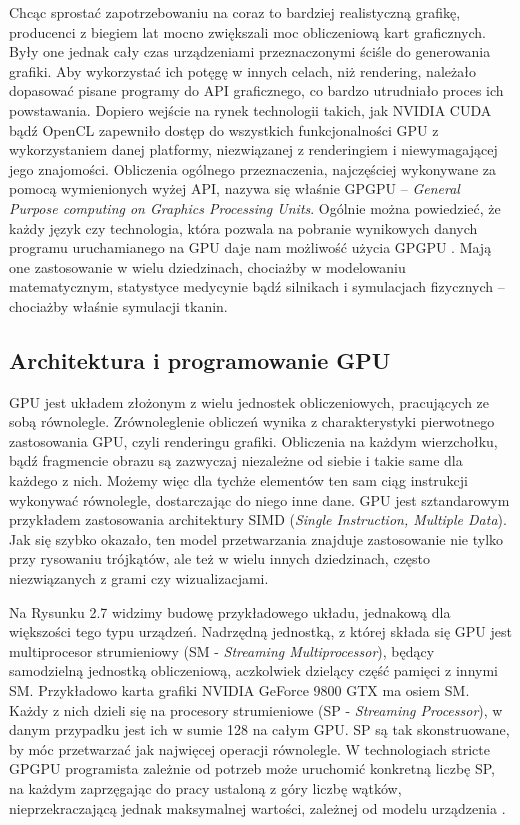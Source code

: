 		Chcąc sprostać zapotrzebowaniu na coraz to bardziej realistyczną grafikę, producenci z biegiem lat mocno zwiększali moc obliczeniową kart graficznych. Były one jednak cały czas urządzeniami przeznaczonymi ściśle do generowania grafiki. Aby wykorzystać ich potęgę w innych celach, niż rendering, należało dopasować pisane programy do API graficznego, co bardzo utrudniało proces ich powstawania. Dopiero wejście na rynek technologii takich, jak NVIDIA CUDA bądź OpenCL zapewniło dostęp do wszystkich funkcjonalności GPU z wykorzystaniem danej platformy, niezwiązanej z renderingiem i niewymagającej jego znajomości. Obliczenia ogólnego przeznaczenia, najczęściej wykonywane za pomocą wymienionych wyżej API, nazywa się właśnie GPGPU -- \emph{General Purpose computing on Graphics Processing Units}. Ogólnie można powiedzieć, że każdy język czy technologia, która pozwala na pobranie wynikowych danych programu uruchamianego na GPU daje nam możliwość użycia GPGPU \cite{gpu_wiki}. Mają one zastosowanie w wielu dziedzinach, chociażby w modelowaniu matematycznym, statystyce medycynie bądź silnikach i symulacjach fizycznych -- chociażby właśnie symulacji tkanin. 
	
		\subsection{Architektura i programowanie GPU}
		\label{t:teoria:gpu:architektura}
		
		
		GPU jest układem złożonym z wielu jednostek obliczeniowych, pracujących ze sobą równolegle. Zrównoleglenie obliczeń wynika z charakterystyki pierwotnego zastosowania GPU, czyli renderingu grafiki. Obliczenia na każdym wierzchołku, bądź fragmencie obrazu są zazwyczaj niezależne od siebie i takie same dla każdego z nich. Możemy więc dla tychże elementów ten sam ciąg instrukcji wykonywać równolegle, dostarczając do niego inne dane. GPU jest sztandarowym przykładem zastosowania architektury SIMD (\emph{Single Instruction, Multiple Data}). Jak się szybko okazało, ten model przetwarzania znajduje zastosowanie nie tylko przy rysowaniu trójkątów, ale też w wielu innych dziedzinach, często niezwiązanych z grami czy wizualizacjami.
		
		Na Rysunku 2.7 widzimy budowę przykładowego układu, jednakową dla większości tego typu urządzeń. Nadrzędną jednostką, z której składa się GPU jest multiprocesor strumieniowy (SM - \emph{Streaming Multiprocessor}), będący samodzielną jednostką obliczeniową, aczkolwiek dzielący część pamięci z innymi SM. Przykładowo karta grafiki NVIDIA GeForce 9800 GTX ma osiem SM. Każdy z nich dzieli się na procesory strumieniowe (SP - \emph{Streaming Processor}), w danym przypadku jest ich w sumie 128 na całym GPU. SP są tak skonstruowane, by móc przetwarzać jak najwięcej operacji równolegle. W technologiach stricte GPGPU programista zależnie od potrzeb może uruchomić konkretną liczbę SP, na każdym zaprzęgając do pracy ustaloną z góry liczbę wątków, nieprzekraczającą jednak maksymalnej wartości, zależnej od modelu urządzenia \cite{cuda}.
		
